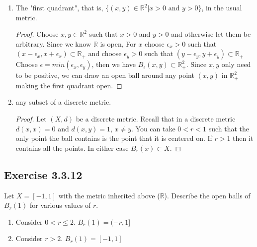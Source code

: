 \documentclass{tufte-book}
\theoremstyle{mytheoremstyle}
\theoremstyle{mylemstyle}
\theoremstyle{mydefstyle}
\begin{document}
\begin{enumerate}
\item The "first quadrant", that is, $\{(x,y) \in \mathbb{R}^2 | x > 0 \text{ and } y > 0 \}$, in the usual metric.

\begin{proof}
Choose $x, y \in \mathbb{R}^2$ such that $x > 0$ and $y > 0$ and otherwise let them be arbitrary.    Since we know $\mathbb{R}$ is open, For $x$ choose $\epsilon_x > 0$ such that $(x-\epsilon_x, x+\epsilon_x) \subset \mathbb{R}_+$ and choose $\epsilon_y >0$ such that $(y-\epsilon_y, y+\epsilon_y) \subset \mathbb{R}_+$   Choose $\epsilon = min(\epsilon_x, \epsilon_y)$, then we have $B_\epsilon(x,y) \subset \mathbb{R}_+^2$.  Since $x,y$ only need to be positive, we can draw an open ball around any point $(x,y)$ in $\mathbb{R}_+^2$ making the first quadrant open.
\end{proof}

\item any subset of a discrete metric.

\begin{proof}
Let $(X, d)$ be a discrete metric.  Recall that in a discrete metric $d(x,x) = 0$ and $d(x,y)=1$, $x \neq y$.   You can take $0<r<1$ such that the only point the ball contains is the point that it is centered on.  If $r>1$ then it contains all the points.  In either case $B_r(x) \subset X$.
\end{proof}
\end{enumerate}

\subsection{Exercise 3.3.12}
Let $X = [-1,1]$ with the metric inherited above ($\mathbb{R}$).  Describe the open balls of $B_r(1)$ for various values of $r$.

\begin{enumerate}

\item Consider $0< r \leq 2$.  $B_r(1) = (-r, 1]$
\item Consider $r > 2$. $B_r(1) = [-1,1]$ 
\end{enumerate}
\end{document}
